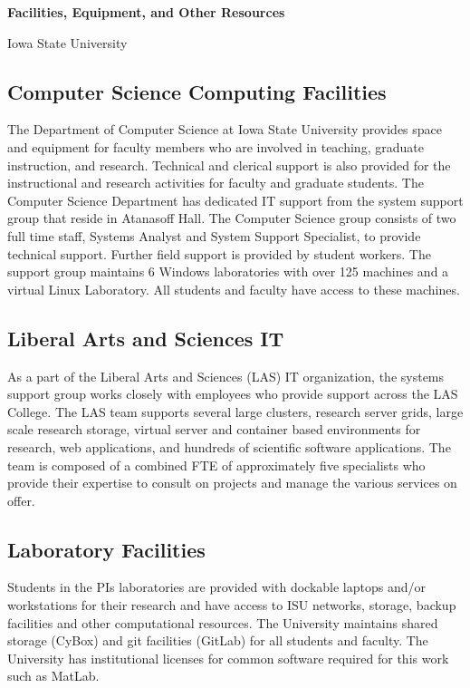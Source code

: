 \documentclass[11pt]{article}
\begin{document}
    \setcounter{page}{1}
    \begin{center}
        {\Large {\bf Facilities, Equipment, and Other Resources}}
    \end{center}

    \begin{center}
        {\Large Iowa State University}
    \end{center}

    \subsection*{Computer Science Computing Facilities}
    The Department of Computer Science at Iowa State University provides space and equipment for faculty members who are involved in teaching, graduate instruction, and research.
    Technical and clerical support is also provided for the instructional and research activities for faculty and graduate students.
    The Computer Science Department has dedicated IT support from the system support group that reside in Atanasoff Hall.
    The Computer Science group consists of two full time staff, Systems Analyst and System Support Specialist, to provide technical support.
    Further field support is provided by student workers.
    The support group maintains 6 Windows laboratories with over 125 machines and a virtual Linux Laboratory.
    All students and faculty have access to these machines.

    \subsection*{Liberal Arts and Sciences IT}
    As a part of the Liberal Arts and Sciences (LAS) IT organization, the systems support group
    works closely with employees who provide support across the LAS College. 
    The LAS  team supports several large clusters, research server grids,
    large scale research storage, virtual server and container based
    environments for research, web applications, and hundreds of
    scientific software applications.  The team is composed of a combined
    FTE of approximately five specialists who provide their expertise to
    consult on projects and manage the various services on offer. 

    \subsection*{Laboratory Facilities}
    Students in the PIs laboratories are provided with dockable laptops and/or workstations for their research and
    have access to ISU networks, storage, backup facilities and other computational resources. The University maintains
    shared storage (CyBox) and git facilities (GitLab) for all students
    and faculty.  The University has institutional licenses for common
    software required for this work such as MatLab. 
\end{document}
